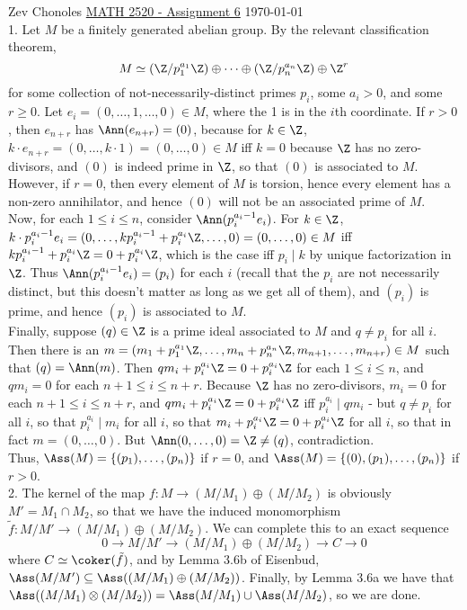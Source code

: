 \documentclass[11pt]{article}
\begin{document}
Zev Chonoles \hfill 
\underline{MATH 2520 - Assignment 6} \hfill \today\\

\num{1.} Let $M$ be a finitely generated abelian group. By the relevant
classification theorem,
\[M\simeq (\Z/p_1^{a_1}\Z)\oplus\cdots\oplus(\Z/p_n^{a_n}\Z)\oplus\Z^r\]
for some collection of not-necessarily-distinct primes $p_i$, some $a_i>0$,
and some $r\geq 0$. Let $e_i=(0,\ldots,1,\ldots,0)\in M$, where the 1 is
in the $i$th coordinate. If $r>0$, then $e_{n+r}$ has $\Ann(e_{n+r})=(0)$,
because for $k\in\Z$, $k\cdot e_{n+r}=(0,\ldots,k\cdot1)=(0,\ldots,0)\in M$
iff $k=0$ because $\Z$ has no zero-divisors, and $(0)$ is indeed prime in
$\Z$, so that $(0)$ is associated to $M$. However, if $r=0$, then every
element of $M$ is torsion, hence every element has a non-zero annihilator,
and hence $(0)$ will not be an associated prime of $M$. \\

Now, for each $1\leq i\leq n$, consider
$\Ann(p_i^{a_i-1}e_i)$. For $k\in\Z$, $k\cdot
p_i^{a_i-1}e_i=(0,\ldots,kp_i^{a_i-1}+p_i^{a_i}\Z,\ldots,0)=(0,\ldots,0)\in M$
iff $kp_i^{a_i-1}+p_i^{a_i}\Z=0+p_i^{a_i}\Z$, which is the case iff $p_i\mid k$
by unique factorization in $\Z$. Thus $\Ann(p_i^{a_i-1}e_i)=(p_i)$ for each $i$
(recall that the $p_i$ are not necessarily distinct, but this doesn't matter
as long as we get all of them), and $(p_i)$ is prime, and hence $(p_i)$
is associated to $M$.\\

Finally, suppose $(q)\in\Z$ is a prime ideal associated
to $M$ and $q\neq p_i$ for all $i$. Then there is an
$m=(m_1+p_1^{a_1}\Z,\ldots,m_n+p_n^{a_n}\Z,m_{n+1},\ldots,m_{n+r})\in M$
such that $(q)=\Ann(m)$. Then $qm_i+p_i^{a_i}\Z=0+p_i^{a_i}\Z$ for each
$1\leq i\leq n$, and $qm_i=0$ for each $n+1\leq i\leq n+r$. Because
$\Z$ has no zero-divisors, $m_i=0$ for each $n+1\leq i\leq n+r$,
and $qm_i+p_i^{a_i}\Z=0+p_i^{a_i}\Z$ iff $p_i^{a_i}\mid qm_i$ - but
$q\neq p_i$ for all $i$, so that $p_i^{a_i}\mid m_i$ for all $i$,
so that $m_i+p_i^{a_i}\Z=0+p_i^{a_i}\Z$ for all $i$, so that in fact
$m=(0,\ldots,0)$. But $\Ann(0,\ldots,0)=\Z\neq(q)$, contradiction.\\

Thus, $\Ass(M)=\{(p_1),\ldots,(p_n)\}$ if $r=0$, and
$\Ass(M)=\{(0),(p_1),\ldots,(p_n)\}$ if $r>0$.\\

\num{2.} The kernel of the map $f:M\rightarrow (M/M_1)\oplus(M/M_2)$
is obviously $M'=M_1\cap M_2$, so that we have the induced monomorphism
$\tilde{f}:M/M'\rightarrow(M/M_1)\oplus(M/M_2)$. We can complete this to an
exact sequence 
\[0\rightarrow M/M'\rightarrow (M/M_1)\oplus(M/M_2)\rightarrow C\rightarrow
0\]
where $C\simeq\coker(\tilde{f})$, and by Lemma 3.6b of Eisenbud,
$\Ass(M/M')\subseteq\Ass((M/M_1)\oplus(M/M_2))$. Finally, by Lemma 3.6a we
have that $\Ass((M/M_1)\otimes(M/M_2))=\Ass(M/M_1)\cup\Ass(M/M_2)$, so we
are done.      \\
\end{document}
